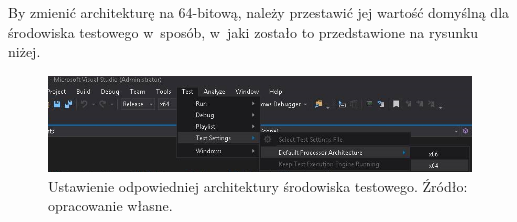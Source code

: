 By zmienić architekturę na 64-bitową, należy przestawić jej wartość domyślną dla środowiska testowego w~sposób, w~jaki zostało to przedstawione na rysunku niżej.

\begin{figure}[H]
	\includegraphics[width=15cm]{img/UnitTests_x64_architecture.png}
	\caption{Ustawienie odpowiedniej architektury środowiska testowego. Źródło: opracowanie własne.}
\end{figure}
